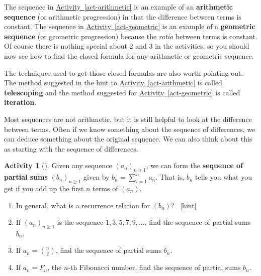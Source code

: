 \documentclass[10pt,]{book}
\newcommand{\terminology}[1]{\textbf{#1}}
\theoremstyle{plain}
\theoremstyle{definition}
\theoremstyle{definition}
\theoremstyle{definition}
\newtheorem{activity}[project]{Activity}
\numberwithin{equation}{chapter}
\begin{document}
\hypertarget{p-929}{}%
The sequence in \hyperref[act-arithmetic]{Activity~\ref{act-arithmetic}} is an example of an \terminology{arithmetic sequence} (or arithmetic progression) in that the difference between terms is constant.  The sequence in \hyperref[act-geometric]{Activity~\ref{act-geometric}} is an example of a \terminology{geometric sequence} (or geometric progression) because the \emph{ratio} between terms is constant.  Of course there is nothing special about 2 and 3 in the activities, so you should now see how to find the closed formula for any arithmetic or geometric sequence.%
\par
\hypertarget{p-930}{}%
The techniques used to get those closed formulas are also worth pointing out.  The method suggested in the hint to \hyperref[act-arithmetic]{Activity~\ref{act-arithmetic}} is called \terminology{telescoping} and the method suggested for \hyperref[act-geometric]{Activity~\ref{act-geometric}} is called \terminology{iteration}.%
\par
\hypertarget{p-931}{}%
Most sequences are not arithmetic, but it is still helpful to look at the difference between terms.  Often if we know something about the sequence of differences, we can deduce something about the original sequence.   We can also think about this as starting with the sequence of differences.%
\begin{activity}[]\label{activity-138}
\hypertarget{p-932}{}%
Given any sequence \((a_n)_{n \ge 1}\), we can form the \terminology{sequence of partial sums} \((b_n)_{n \ge 1}\) given by \(b_n = \sum_{i = 1}^n a_n\).  That is, \(b_n\) tells you what you get if you add up the first \(n\) terms of \((a_n)\).%
\begin{enumerate}[font=\bfseries,label=(\alph*),ref=\alph*]
\item\label{task-175} \hypertarget{p-933}{}%
In general, what is a recurrence relation for \((b_n)\)?%
~\hfill{\tiny\hyperlink{a-145.a}{[hint]}\hypertarget{q-145.a}{}}\item\label{task-176} \hypertarget{p-935}{}%
If \((a_n)_{n \ge 1}\) is the sequence \(1, 3, 5, 7, 9, \ldots\), find the sequence of partial sums \(b_n\).%
\item\label{task-177} \hypertarget{p-936}{}%
If \(a_n = \binom{n}{2}\), find the sequence of partial sums \(b_n\).%
\item\label{task-178} \hypertarget{p-937}{}%
If \(a_n = F_n\), the \(n\)-th Fibonacci number, find the sequence of partial sums \(b_n\).%
\end{enumerate}
\end{activity}
\end{document}
